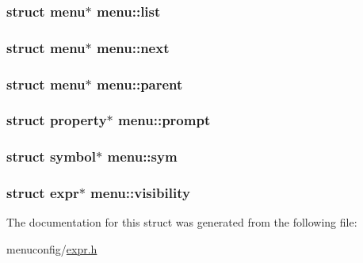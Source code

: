 \hypertarget{structmenu_ac08df28efcd13c950848efd4701c7997}{
\subsubsection[{list}]{\setlength{\rightskip}{0pt plus 5cm}struct {\bf menu}$\ast$ menu\-::list}}\label{structmenu_ac08df28efcd13c950848efd4701c7997}
\hypertarget{structmenu_a45b3c151ab09fa1a7c610f6e1434b0c3}{
\subsubsection[{next}]{\setlength{\rightskip}{0pt plus 5cm}struct {\bf menu}$\ast$ menu\-::next}}\label{structmenu_a45b3c151ab09fa1a7c610f6e1434b0c3}
\hypertarget{structmenu_ab37f2faa5398d13b27ca50dcfd4e36e4}{
\subsubsection[{parent}]{\setlength{\rightskip}{0pt plus 5cm}struct {\bf menu}$\ast$ menu\-::parent}}\label{structmenu_ab37f2faa5398d13b27ca50dcfd4e36e4}
\hypertarget{structmenu_a41dea0b424c67721b50a13a00c4c57b9}{
\subsubsection[{prompt}]{\setlength{\rightskip}{0pt plus 5cm}struct {\bf property}$\ast$ menu\-::prompt}}\label{structmenu_a41dea0b424c67721b50a13a00c4c57b9}
\hypertarget{structmenu_a0ba1034a38638e364526407d5ae98c1f}{
\subsubsection[{sym}]{\setlength{\rightskip}{0pt plus 5cm}struct {\bf symbol}$\ast$ menu\-::sym}}\label{structmenu_a0ba1034a38638e364526407d5ae98c1f}
\hypertarget{structmenu_a45459a85f3d75f307aaf0e37f5a79357}{
\subsubsection[{visibility}]{\setlength{\rightskip}{0pt plus 5cm}struct {\bf expr}$\ast$ menu\-::visibility}}\label{structmenu_a45459a85f3d75f307aaf0e37f5a79357}


The documentation for this struct was generated from the following file\-:\begin{DoxyCompactItemize}
\item 
menuconfig/\hyperlink{expr_8h}{expr.\-h}\end{DoxyCompactItemize}
